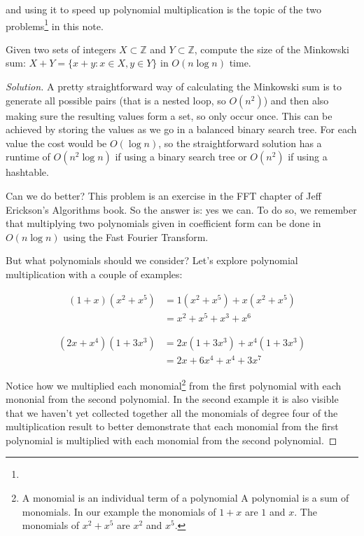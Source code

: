  and using it to speed up polynomial multiplication is the topic of the two problems\footnote{} in this note.

\vspace{10 mm}
\begin{problem}
Given two sets of integers $X \subset \mathbb{Z}$ and $Y \subset \mathbb{Z}$, compute the size of the Minkowski sum: $X + Y = \{x + y: x \in X, y \in Y\}$ in $O(n \log n)$ time.
\end{problem}

\begin{proof}[Solution]
A pretty straightforward way of calculating the Minkowski sum is to generate all possible pairs (that is a nested loop, so $O(n^2)$) and then also making sure the resulting values form a set, so only occur once. This can be achieved by storing the values as we go in a balanced binary search tree. For each value the cost would be $O(\log n)$, so the straightforward solution has a runtime of $O(n^2 \log n)$ if using a binary search tree or $O(n^2)$ if using a hashtable.


Can we do better? This problem is an exercise in the FFT chapter of Jeff Erickson's Algorithms book. So the answer is: yes we can. To do so, we remember that multiplying two polynomials given in coefficient form can be done in $O(n \log n)$ using the Fast Fourier Transform.

But what polynomials should we consider? Let's explore polynomial multiplication with a couple of examples:

\begin{align*}
(1 + x) (x^2 + x^5) &= 1 (x^2 + x^5) + x (x^2 + x^5) \\
                    &= x^2 + x^5 + x^3 + x^6 
\end{align*}

\begin{align*}
(2 x + x^4) (1 + 3 x^3) &= 2 x (1 + 3 x^3) + x^4 (1 + 3 x^3) \\
                        &= 2 x + 6 x^4 + x^4 + 3 x^7
\end{align*}
 
Notice how we multiplied each monomial\footnote{A monomial is an individual term of a polynomial A polynomial is a sum of monomials. In our example the monomials of $1 + x$ are $1$ and $x$. The monomials of $x^2 + x^5$ are $x^2$ and $x^5$.} from the first polynomial with each mononial from the second polynomial. In the second example it is also visible that we haven't yet collected together all the monomials of degree four of the multiplication result to better demonstrate that each monomial from the first polynomial is multiplied with each monomial from the second polynomial. 


\end{proof}
